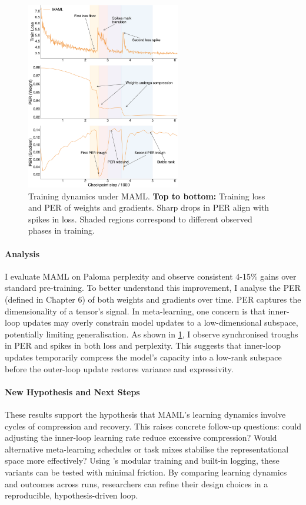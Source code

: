 \begin{figure}[h!]
    \centering
    \includegraphics[width=0.6\textwidth]{chapters/pico/figures/maml-example.pdf}
    \caption{Training dynamics under MAML.
    \textbf{Top to bottom:} Training loss and PER of weights and gradients.
    Sharp drops in PER align with spikes in loss. Shaded regions correspond to different observed phases in training. 
    }
    \label{fig:maml_example}
\end{figure}


\paragraph{Analysis} I evaluate MAML on Paloma perplexity and observe consistent 4-15\% gains over standard pre-training. To better understand this improvement, I analyse the PER (defined in Chapter 6) of both weights and gradients over time. PER captures the dimensionality of a tensor's signal. In meta-learning, one concern is that inner-loop updates may overly constrain model updates to a low-dimensional subspace, potentially limiting generalisation. As shown in \cref{fig:maml_example}, I observe synchronised troughs in PER and spikes in both loss and perplexity. This suggests that inner-loop updates temporarily compress the model's capacity into a low-rank subspace before the outer-loop update restores variance and expressivity.


\paragraph{New Hypothesis and Next Steps}
These results support the hypothesis that MAML's learning dynamics involve cycles of compression and recovery. This raises concrete follow-up questions: could adjusting the inner-loop learning rate reduce excessive compression? Would alternative meta-learning schedules or task mixes stabilise the representational space more effectively? Using \pico's modular training and built-in logging, these variants can be tested with minimal friction. By comparing learning dynamics and outcomes across runs, researchers can refine their design choices in a reproducible, hypothesis-driven loop.%

